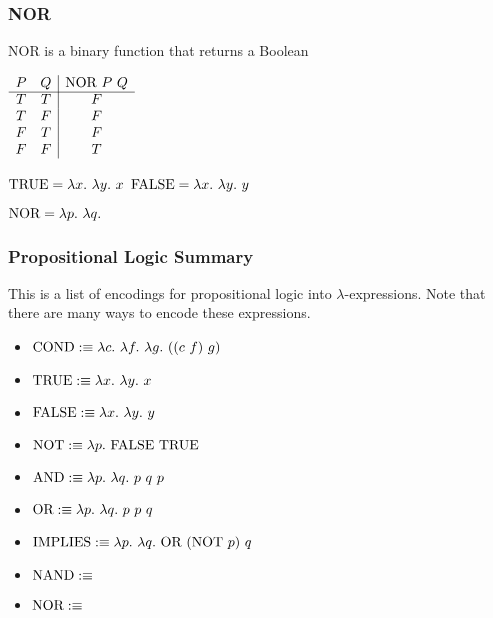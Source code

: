 \documentclass{beamer}
\begin{document}
\begin{frame}
	\frametitle{NOR}

	NOR is a binary function that returns a Boolean

	\begin{center}
		$\begin{array}{ c c | c }			
			P & Q & \NOR \ P \ Q\\
			\cline{1 - 3}
			T & T & F \\ 
			T & F & F \\ 
			F & T & F \\ 
			F & F & T
		\end{array}$
	\end{center}

	$\TRUE = \lambda x. \ \lambda y. \ x$ \hspace{4cm} $\FALSE = \lambda x. \ \lambda y. \ y$

	\vspace{0.5cm}

	$\NOR = \lambda p. \ \lambda q. \  $

	\vspace{2cm}
	
\end{frame}

\begin{frame}
	\frametitle{Propositional Logic Summary}

	This is a list of encodings for propositional logic into $\lambda$-expressions. Note that there are many ways to encode these expressions.

	\vspace{0.5cm}

	\begin{itemize}
		\item[] $\text{COND} :\equiv \lambda c. \ \lambda f. \ \lambda g. \ ((c \ f) \ g)$
		\item[] $\text{TRUE} :\equiv \lambda x. \ \lambda y. \ x$
		\item[] $\text{FALSE} :\equiv \lambda x. \ \lambda y. \ y$
		\item[] $\NOT :\equiv \lambda p. \ \FALSE \ \TRUE$
		\item[] $\AND :\equiv \lambda p. \ \lambda q. \ p \ q \ p$
		\item[] $\OR :\equiv \lambda p. \ \lambda q. \ p \ p \ q$
		\item[] $\IMP :\equiv \lambda p. \ \lambda q. \ \OR \ (\text{NOT} \ p) \ q$
		\item[] $\text{NAND} :\equiv $
		\item[] $\text{NOR} :\equiv $

	\end{itemize}

\end{frame}
\end{document}

